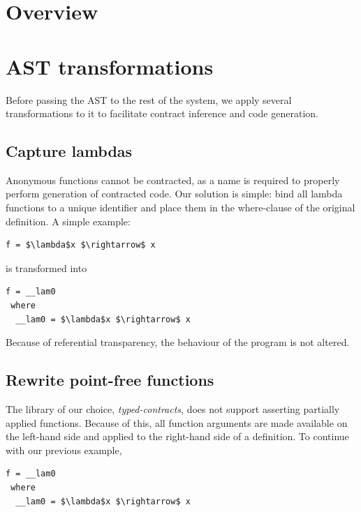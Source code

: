 \documentclass[10pt]{report}
\begin{document}
\section{Overview}
\label{section:overview}




\section{AST transformations}
Before passing the AST to the rest of the system, we apply several transformations to it to facilitate contract inference and code generation.

\subsection{Capture lambdas}
Anonymous functions cannot be contracted, as a name is required to properly  perform generation of contracted code.
Our solution is simple: bind all lambda functions to a unique identifier and place them in the where-clause of the original definition.
A simple example:

\begin{lstlisting}[mathescape]
f = $\lambda$x $\rightarrow$ x
\end{lstlisting}

is transformed into

\begin{lstlisting}[mathescape,caption=Result of lambda capture transformation.]
f = __lam0                   
 where                    
  __lam0 = $\lambda$x $\rightarrow$ x
\end{lstlisting}

Because of referential transparency, the behaviour of the program is not altered.

\subsection{Rewrite point-free functions}
The library of our choice, \textit{typed-contracts}, does not support asserting partially applied functions.
Because of this, all function arguments are made available on the left-hand side and applied to the right-hand side of a definition.
To continue with our previous example,

\begin{lstlisting}[mathescape]
f = __lam0                   
 where                    
  __lam0 = $\lambda$x $\rightarrow$ x
\end{lstlisting}
\end{document}
